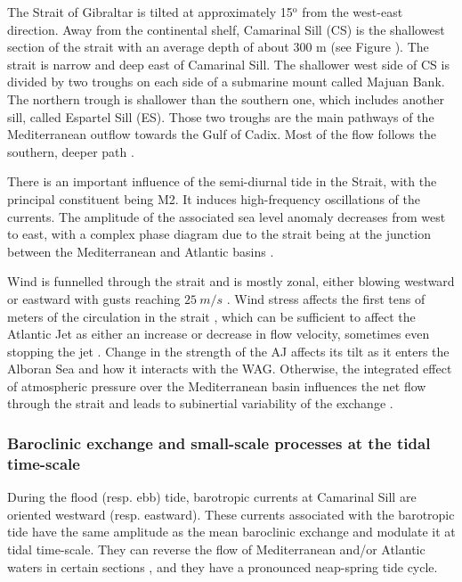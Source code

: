 The Strait of Gibraltar is tilted at approximately 15$^\text{o}$ from the west-east direction. Away from the continental shelf, Camarinal Sill (CS) is the shallowest section of the strait with an average depth of about 300 m (see Figure ). The strait is narrow and deep east of Camarinal Sill. The shallower west side of CS is divided by two troughs on each side of a submarine mount called Majuan Bank. The northern trough is shallower than the southern one, which includes another sill, called Espartel Sill (ES). Those two troughs are the main pathways of the Mediterranean outflow towards the Gulf of Cadix. Most of the flow follows the southern, deeper path \citep{sanchez-roman_2009}.

There is an important influence of the semi-diurnal tide in the Strait, with the principal constituent being M2. It induces high-frequency oscillations of the currents.
The amplitude of the associated sea level anomaly decreases from west to east, with a complex phase diagram due to the strait being at the junction between the Mediterranean and Atlantic basins \citep{garcialafuente_1990,CW90}.

Wind is funnelled through the strait and is mostly zonal, either blowing westward or eastward with gusts reaching $25\ m/s$ \citep{candela_1989}. Wind stress affects the first tens of meters of the circulation in the strait \citep{candela_1989}, which can be sufficient to affect the Atlantic Jet as either an increase or decrease in flow velocity, %
sometimes even stopping the jet \citep{garcialafuente_2002c}. Change in the strength of the AJ affects its tilt as it enters the Alboran Sea and how it interacts with the WAG. Otherwise, the integrated effect of atmospheric pressure over the Mediterranean basin influences the net flow through the strait and leads to subinertial variability of the exchange \citep{garcialafuente_2002}.

\subsubsection{Baroclinic exchange and small-scale processes at the tidal time-scale}

During the flood (resp. ebb) tide, barotropic currents at Camarinal Sill  are oriented westward (resp. eastward). These currents associated with the barotropic tide have the same amplitude as the mean baroclinic exchange and modulate it at tidal time-scale. They can reverse the flow of Mediterranean and/or Atlantic waters in certain sections \citep{sanchez-roman_2012}, and they have a pronounced neap-spring tide cycle.

